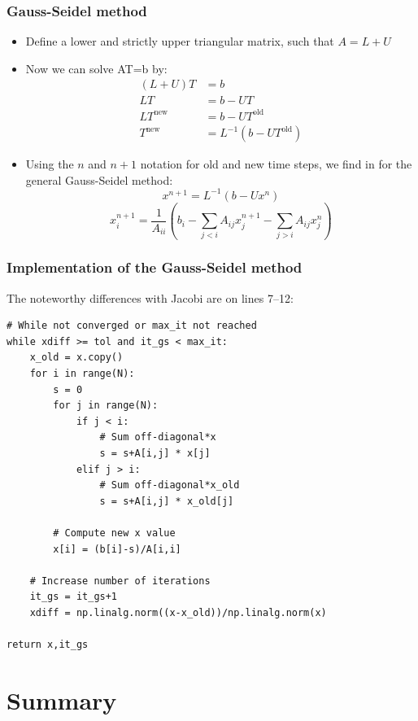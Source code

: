 \begin{frame}[fragile]
  \frametitle{Gauss-Seidel method}
  \begin{itemize}
    \item Define a lower and strictly upper triangular matrix, such that $A = L + U$
    \item Now we can solve AT=b by:
    \begin{align*}
      (L+U)T &= b \\
      LT &= b - UT \\
      LT^\text{new} &= b - UT^\text{old} \\
      T^\text{new} &= L^{-1}(b-UT^\text{old})
   \end{align*}
     \item Using the $n$ and $n+1$ notation for old and new time steps, we find in for the general Gauss-Seidel method:
     \[
      x^{n+1} = L^{-1}\left(b-Ux^n\right)
     \]
     \[
      x_i^{n+1} = \frac{1}{A_{ii}}\left(b_i - \sum_{j<i} A_{ij}x_j^{n+1}- \sum_{j>i} A_{ij}x_j^n\right)
     \]
  \end{itemize}
\end{frame}

\begin{frame}[fragile]
  \frametitle{Implementation of the Gauss-Seidel method}
  The noteworthy differences with Jacobi are on lines 7--12:
  \begin{lstlisting}[basicstyle=\scriptsize\ttfamily]
# While not converged or max_it not reached
while xdiff >= tol and it_gs < max_it:
    x_old = x.copy()
    for i in range(N):
        s = 0
        for j in range(N):
            if j < i:
                # Sum off-diagonal*x
                s = s+A[i,j] * x[j]
            elif j > i:
                # Sum off-diagonal*x_old
                s = s+A[i,j] * x_old[j]

        # Compute new x value
        x[i] = (b[i]-s)/A[i,i]

    # Increase number of iterations
    it_gs = it_gs+1
    xdiff = np.linalg.norm((x-x_old))/np.linalg.norm(x)

return x,it_gs
\end{lstlisting}
\end{frame}

\section{Summary}
